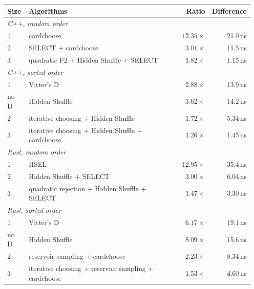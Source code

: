 \begin{tabular}{ llrr }
Size & Algorithms & Ratio & Difference \\
\hline
\multicolumn{4}{l}{\emph{C++, random order}} \\
1 & cardchoose & \(12.35\times\) & 21.0\,ns \\
2 & SELECT + cardchoose & \(3.01\times\) & 11.5\,ns \\
3 & quadratic F2 + Hidden Shuffle + SELECT & \(1.82\times\) & 1.15\,ns \\
\multicolumn{4}{l}{\emph{C++, sorted order}} \\
1 & Vitter's D & \(2.88\times\) & 13.9\,ns \\
no D & Hidden Shuffle & \(3.62\times\) & 14.2\,ns \\
2 & iterative choosing + Hidden Shuffle & \(1.72\times\) & 5.34\,ns \\
3 & iterative choosing + Hidden Shuffle + cardchoose & \(1.26\times\) & 1.45\,ns \\
\multicolumn{4}{l}{\emph{Rust, random order}} \\
1 & HSEL & \(12.95\times\) & 35.4\,ns \\
2 & Hidden Shuffle + SELECT & \(3.00\times\) & 6.04\,ns \\
3 & quadratic rejection + Hidden Shuffle + SELECT & \(1.47\times\) & 3.30\,ns \\
\multicolumn{4}{l}{\emph{Rust, sorted order}} \\
1 & Vitter's D & \(6.17\times\) & 19.1\,ns \\
no D & Hidden Shuffle & \(8.09\times\) & 15.6\,ns \\
2 & reservoir sampling + cardchoose & \(2.23\times\) & 8.34\,ns \\
3 & iterative choosing + reservoir sampling + cardchoose & \(1.53\times\) & 4.60\,ns \\
\end{tabular}

